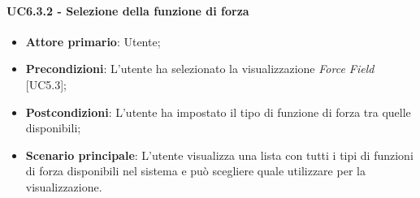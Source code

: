 \paragraph{UC6.3.2 - Selezione della funzione di forza}
\begin{itemize}
	\item \textbf{Attore primario}: Utente;
	\item \textbf{Precondizioni}: L'utente ha selezionato la visualizzazione \textit{Force Field} [UC5.3];
	\item \textbf{Postcondizioni}: L'utente ha impostato il tipo di funzione di forza tra quelle disponibili;
	
	\item \textbf{Scenario principale}: L'utente visualizza una lista con tutti i tipi di funzioni di forza disponibili nel sistema e può scegliere quale utilizzare per la visualizzazione.
\end{itemize}